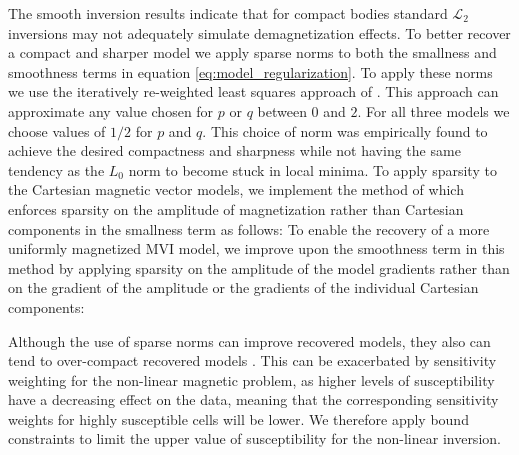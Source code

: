 \documentclass{segabs}
\begin{document}
The smooth inversion  results indicate that for compact bodies standard  $\mathcal{L}_2$ inversions may not adequately simulate demagnetization effects. To better recover a compact and sharper model we apply sparse norms to both the smallness and smoothness terms in equation \ref{eq:model_regularization}. To apply these norms we use the iteratively re-weighted least squares approach of \cite{Fournier2019}. This approach can approximate any value chosen for $p$ or $q$ between $0$ and $2$. For all three models we choose values of $1/2$ for $p$ and $q$. This choice of norm was empirically found to achieve the desired compactness and sharpness while not having the same tendency as the $L_0$ norm to become stuck in local minima. To apply sparsity to the Cartesian magnetic vector models, we implement the method of \cite{Ghalenhnoee2021} which enforces sparsity on the amplitude of magnetization rather than Cartesian components in the smallness term as follows:
To enable the recovery of a more uniformly magnetized MVI model, we improve upon the smoothness term in this method by applying sparsity on the amplitude of the model gradients rather than on the gradient of the amplitude or the gradients of the individual Cartesian components:


Although the use of sparse norms can improve recovered models, they also can tend to over-compact recovered models \citep{Li2018}. This can be exacerbated by sensitivity weighting for the non-linear magnetic problem, as higher levels of susceptibility have a decreasing effect on the data, meaning that the corresponding sensitivity weights for highly susceptible cells will be lower. We therefore apply bound constraints to limit the upper value of susceptibility for the non-linear inversion.


\end{document}
